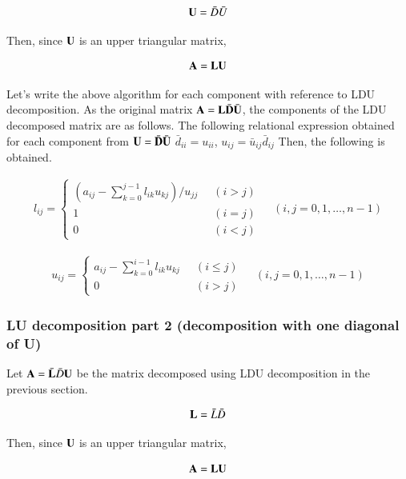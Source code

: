 \begin{equation}
\mathbf{U} = \bar{D}\bar{U}
\end{equation}

Then, since $\mathbf{U}$ is an upper triangular matrix,

\begin{equation}
\mathbf{A} = \mathbf{L}\mathbf{U}
\end{equation}

Let's write the above algorithm for each component with reference to LDU decomposition. As the original matrix $\mathbf{A}=\mathbf{L}\bar{\mathbf{D}}\bar{\mathbf{U}}$, the components of the LDU decomposed matrix are as follows. The following relational expression obtained for each component from $\mathbf{U} = \bar{\mathbf{D}}\bar{\mathbf{U}}$
$\bar{d}_{ii} = u_{ii}$, $u_{ij} = \bar{u}_{ij}\bar{d}_{ij}$
Then, the following is obtained.

\begin{eqnarray}
l_{ij} = \left\{\begin{array}{ll}
\left(a_{ij} - \sum_{k=0}^{j-1} l_{ik} u_{kj}\right)/u_{jj}\;\; &  (i>j)\\
1 &(i=j)\\
0 & (i<j)
\end{array}\right.\;\;\;\; (i,j=0,1,\ldots,n-1)
\end{eqnarray}


\begin{eqnarray}
u_{ij} = \left\{\begin{array}{ll}
a_{ij} - \sum_{k=0}^{i-1} l_{ik} u_{kj}\;\; & (i\le j)\\
0 & (i>j)\end{array}\right.\;\;\;\; (i,j=0,1,\ldots,n-1)
\end{eqnarray}


\subsubsection{LU decomposition part 2 (decomposition with one diagonal of U)}

Let $\mathbf{A}=\bar{\mathbf{L}}\bar{D}\mathbf{U}$ be the matrix decomposed using LDU decomposition in the previous section.

\begin{equation}
\mathbf{L} = \bar{L}\bar{D}
\end{equation}

Then, since $\mathbf{U}$ is an upper triangular matrix,

\begin{equation}
\mathbf{A} = \mathbf{L}\mathbf{U}
\end{equation}

